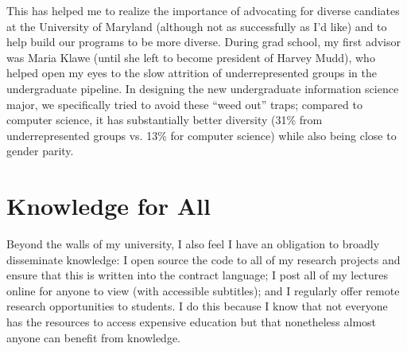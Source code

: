 \documentclass[11pt]{amsart}
\begin{document}
This has helped me to realize the importance of advocating for diverse candiates at the University of Maryland (although not as successfully as I'd like) and to help build our programs to be more diverse.
%
During grad school, my first advisor was Maria Klawe (until she left to become president of Harvey Mudd), who helped open my eyes to the slow attrition of underrepresented groups in the undergraduate pipeline.
%
In designing the new undergraduate information science major, we specifically tried to avoid these ``weed out'' traps; compared to computer science, it has substantially better diversity (31\% from underrepresented groups vs. 13\% for computer science) while also being close to gender parity.

\section{Knowledge for All}

Beyond the walls of my university, I also feel I have an obligation to broadly disseminate knowledge: I open source the code to all of my research projects and ensure that this is written into the contract language; I post all of my lectures online for anyone to view (with accessible subtitles); and I regularly offer remote research opportunities to students.
%
I do this because I know that not everyone has the resources to access expensive education but that nonetheless almost anyone can benefit from knowledge.


%
%
\end{document}
